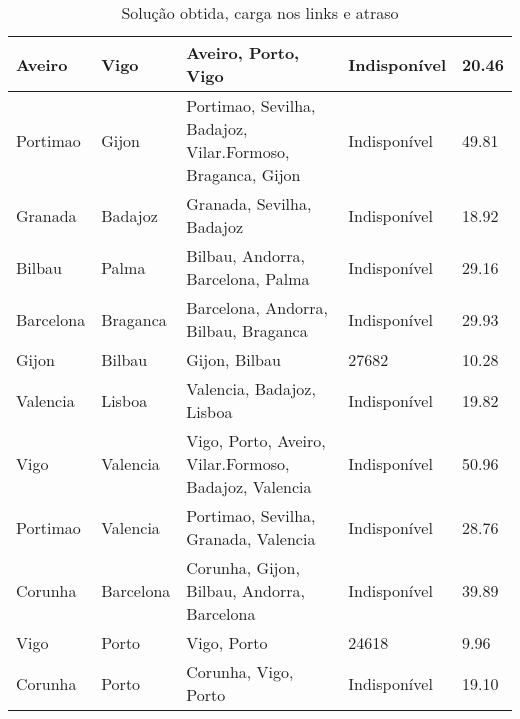 \begin{table}[!htb]
{\begin{tabular}{|l|l|l|l|l|}
Aveiro & Vigo & Aveiro, Porto, Vigo & Indisponível & 20.46 \\ \hline
Portimao & Gijon & Portimao, Sevilha, Badajoz, Vilar.Formoso, Braganca, Gijon & Indisponível & 49.81 \\ \hline
Granada & Badajoz & Granada, Sevilha, Badajoz & Indisponível & 18.92 \\ \hline
Bilbau & Palma & Bilbau, Andorra, Barcelona, Palma & Indisponível & 29.16 \\ \hline
Barcelona & Braganca & Barcelona, Andorra, Bilbau, Braganca & Indisponível & 29.93 \\ \hline
Gijon & Bilbau & Gijon, Bilbau & 27682 & 10.28 \\ \hline
Valencia & Lisboa & Valencia, Badajoz, Lisboa & Indisponível & 19.82 \\ \hline
Vigo & Valencia & Vigo, Porto, Aveiro, Vilar.Formoso, Badajoz, Valencia & Indisponível & 50.96 \\ \hline
Portimao & Valencia & Portimao, Sevilha, Granada, Valencia & Indisponível & 28.76 \\ \hline
Corunha & Barcelona & Corunha, Gijon, Bilbau, Andorra, Barcelona & Indisponível & 39.89 \\ \hline
Vigo & Porto & Vigo, Porto & 24618 & 9.96 \\ \hline
Corunha & Porto & Corunha, Vigo, Porto & Indisponível & 19.10 \\ \hline
\end{tabular}}
\caption[]{Solução obtida, carga nos links e atraso}
\end{table}

